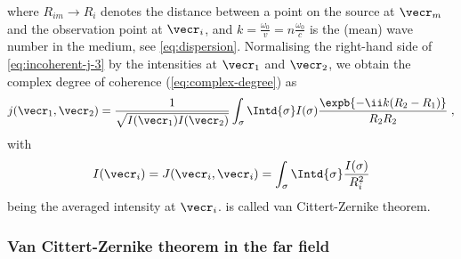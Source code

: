 \documentclass[
twoside,
openright,
titlepage,
numbers=noenddot,
headinclude,
fleqn,
a4paper,
footinclude=true,
cleardoublepage=empty,
abstractoff,
BCOR=5mm,
paper=a4,
fontsize=11pt,
british,ngerman,american,
]{scrreprt}
\begin{document}
where $R_{i m}\to R_i$ denotes the distance between a point on the
source at $\vecr_m$ and the observation point at $\vecr_i$, and
$k=\frac{\omega_0}{v}=n\frac{\omega_0}{c}$ is the (mean) wave number
in the medium, see \cref{eq:dispersion}.  Normalising the right-hand
side of \cref{eq:incoherent-j-3} by the intensities at $\vecr_1$ and
$\vecr_2$, we obtain the complex degree of coherence 
(\cref{eq:complex-degree}) as
\begin{equation}
  \label{eq:van-cittert-zernike}
  \begin{split}
    j(\vecr_1,\vecr_2) = 
    \frac{1}{\sqrt{I(\vecr_1)I(\vecr_2)}} 
    \int_\sigma \Intd{\sigma} I(\sigma)
    \frac{\expb{-\ii k (R_2-R_1)}}{R_2 R_2} \;,
  \end{split}
\end{equation}
with
\begin{equation}
  \label{eq:point-intensity}
  I(\vecr_i) = J(\vecr_i,\vecr_i) = 
  \int_\sigma \Intd{\sigma}  \frac{I(\sigma)}{R_i^2}
\end{equation}
being the averaged intensity at $\vecr_i$.
 is called van Cittert-Zernike theorem.

\subsubsection{Van Cittert-Zernike theorem in the far field}
\label{sec:van-cittert-zernike-far-field}
\end{document}
